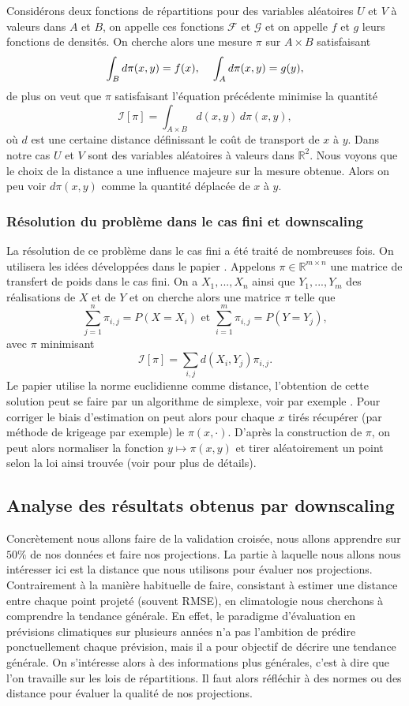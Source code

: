 \documentclass[a4paper,11pt]{article}
\begin{document}
Considérons deux fonctions de répartitions pour des variables aléatoires $U$ et $V$ à valeurs dans $A$ et $B$, on appelle ces fonctions $\mathcal{F}$ et $\mathcal{G}$ et on appelle $f$ et $g$ leurs fonctions de densités. On cherche alors une mesure $\pi$ sur  $A \times B$ satisfaisant
\[\int_{B} d\pi(x,y)= f(x), \hspace{4mm} \int_{A}  d \pi(x,y)= g(y),\]
de plus on veut que $\pi$ satisfaisant l'équation précédente minimise la quantité
\[\mathcal{I}[\pi]=\int_{A \times B}d(x,y) \, d\pi(x,y),\]
où $d$ est une certaine distance définissant le coût de transport de $x$ à $y$. Dans notre cas $U$ et $V$ sont des variables aléatoires à valeurs dans $\mathbb{R}^2$. Nous voyons que le choix de la distance a une influence majeure sur la mesure obtenue. Alors on peu voir $d\pi(x,y)$ comme la quantité déplacée de $x$ à $y$.
\subsubsection{Résolution du problème dans le cas fini et downscaling}
La résolution de ce problème dans le cas fini a été traité de nombreuses fois. On utilisera les idées développées dans le papier \cite{robin2019multivariate}. Appelons $\pi \in \mathbb{R}^{m\times n}$ une matrice de transfert de poids dans le cas fini. On a $X_1,...,X_n$ ainsi que $Y_1,...,Y_m$ des réalisations de $X$ et de $Y$ et on cherche alors une matrice $\pi$ telle que 
\[\sum_{j=1}^{n} \pi_{i,j}= P(X=X_i) \textrm{ et } \sum_{i=1}^{m} \pi_{i,j}= P(Y=Y_j),\]
avec $\pi$ minimisant 
\[\mathcal{I}[\pi]=\sum_{i,j}d(X_i,Y_j)\pi_{i,j}.\]  
Le papier utilise la norme euclidienne comme distance, l'obtention de cette solution peut se faire par un algorithme de simplexe, voir par exemple \cite{huang2012optimal}. Pour corriger le biais d'estimation on peut alors pour chaque $x$ tirés récupérer (par méthode de krigeage par exemple) le $\pi(x,\cdot)$. D'après la construction de $\pi$, on peut alors normaliser la fonction $y\mapsto \pi(x,y)$ et tirer aléatoirement un point selon la loi ainsi trouvée (voir \cite{robin2019multivariate} pour plus de détails).




\subsection{Analyse des résultats obtenus par downscaling}
\label{analyse-pred}
Concrètement nous allons faire de la validation croisée, nous allons apprendre sur $50\%$ de nos données et faire nos projections. La partie à laquelle nous allons nous intéresser ici est la distance que nous utilisons pour évaluer nos projections. Contrairement à la manière habituelle de faire, consistant à estimer une distance entre chaque point projeté (souvent RMSE), en climatologie nous cherchons à comprendre la tendance générale. En effet, le paradigme d'évaluation en prévisions climatiques sur plusieurs années n'a pas l'ambition de prédire ponctuellement chaque prévision, mais il a pour objectif de décrire une tendance générale. On s'intéresse alors à des informations plus générales, c'est à dire que l'on travaille sur les lois de répartitions. Il faut alors réfléchir à des normes ou des distance pour évaluer la qualité de nos projections.  
\end{document}
